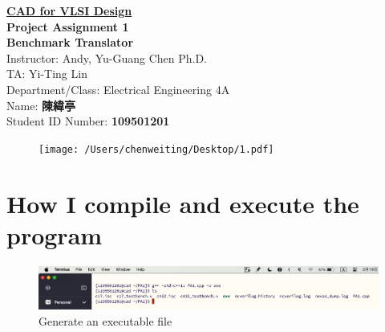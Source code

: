 \documentclass{article}
\begin{document}
\thispagestyle{empty}

\begin{center}
        \vspace*{3cm} %
        {\Huge\bf
            \underline{CAD for VLSI Design }\\}%
        \vspace{3cm}
        {\bf\huge Project Assignment 1\\}
        \vspace{0.5cm}
        {\bf\fontsize{23pt}{20}\selectfont Benchmark Translator\\}
        \vspace{4cm}
        {\fontsize{23pt}{26pt} \selectfont Instructor: Andy, Yu-Guang Chen  Ph.D.\\}
        {\fontsize{20pt}{26pt} \selectfont TA: Yi-Ting Lin\\}
        \vspace{2cm}
        \fontsize{22pt}{25pt}\selectfont
        Department/Class: Electrical Engineering 4A\\
        \vspace*{1em}
        Name: {\bf 陳緯亭}\\
        \vspace*{1em}
        Student ID Number: {\bf 109501201}\\
\vspace{2cm}
\end{center}
\newpage


\tableofcontents
\listoflistings


\thispagestyle{empty}
\newpage


 \setcounter{page}{1}



\begin{figure}[H]
\flushleft
    \texttt{[image: /Users/chenweiting/Desktop/1.pdf]}
\end{figure}

\section{How I compile and execute the program}

\begin{figure}[H]
  \centering
  \includegraphics[width=\linewidth]{./img/2024-03-19-09-22-38.png}
  \caption{Generate an executable file}
  \label{g++}
\end{figure}
\end{document}
